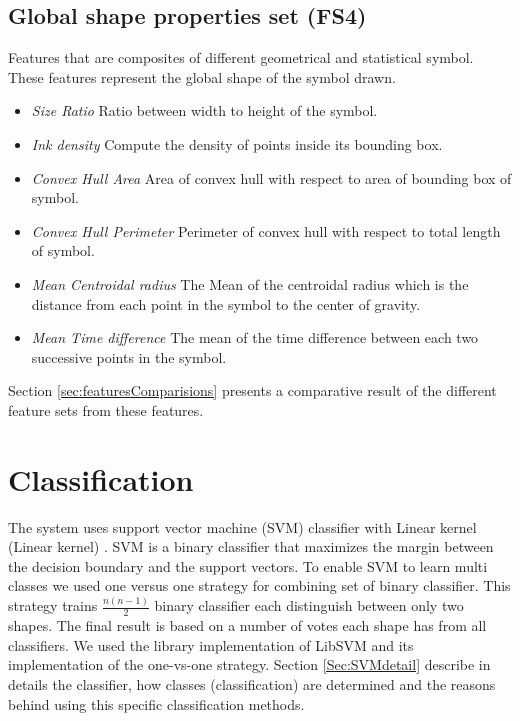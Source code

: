 \subsection{Global shape properties set (FS4)}
 Features that are composites of different geometrical and statistical symbol. These features represent the global shape of the symbol drawn.

 	\begin{itemize}
\item \emph{Size Ratio} Ratio between width to height of the symbol.
	\item \emph{Ink density} Compute the density of points inside its bounding box\cite{GeometryAndDomain102}.   
 	\item \emph{Convex Hull Area} Area of convex hull with respect to area of bounding box of symbol.
	\item \emph{Convex Hull Perimeter} Perimeter of convex hull with respect to total length of symbol.
		\item \emph{Mean Centroidal radius} The Mean of the centroidal radius which is the distance from each point in the symbol to the center of gravity.
	
	\item \emph{Mean Time difference} The mean of the time difference between each two successive points in the symbol. %
  \end{itemize}
  
 Section \ref{sec:featuresComparisions} presents a comparative result of the different feature sets from these features.

\section{Classification}%
\label{sec:Classification}
The system uses support vector machine (SVM) classifier with Linear kernel (Linear kernel) \cite{libsvm}. SVM is a binary classifier that maximizes the margin between the decision boundary and the support vectors. To enable SVM to learn multi classes we used one versus one strategy for combining set of binary classifier. This strategy trains $ \frac{n(n-1)}{{2}}$ binary classifier each distinguish between only two shapes. The final result is based on a number of votes each shape has from all classifiers. We used the library implementation of LibSVM \cite{libsvm} and its implementation of the one-vs-one strategy. Section \ref{Sec:SVMdetail} describe in details the classifier, how classes (classification) are determined and the reasons behind using this specific classification methods.

